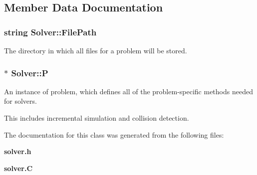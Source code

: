 \subsection{Member Data Documentation}
\subsubsection{\setlength{\rightskip}{0pt plus 5cm}string Solver::File\-Path}\label{classSolver_m0}


The directory in which all files for a problem will be stored.

\subsubsection{ $\ast$ Solver::P}\label{classSolver_m1}


An instance of problem, which defines all of the problem-specific methods needed for solvers.

This includes incremental simulation and collision detection. 

The documentation for this class was generated from the following files:\begin{CompactItemize}
\item 
{\bf solver.h}\item 
{\bf solver.C}\end{CompactItemize}

